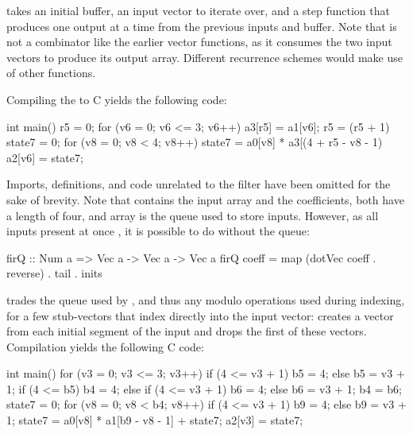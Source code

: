 \documentclass[../paper.tex]{subfiles}
\begin{document}
\noindent {} takes an initial buffer, an input vector to iterate over, and a step function that produces one output at a time from the previous inputs and buffer. Note that  is not a combinator like the earlier vector functions, as it consumes the two input vectors to produce its output array. Different recurrence schemes would make use of other functions. 


Compiling the  to C yields the following code:

\begin{code}
int main() {    
  r5 = 0;
  for (v6 = 0; v6 <= 3; v6++) {
    a3[r5] = a1[v6];
    r5 = (r5 + 1) %
    state7 = 0;
    for (v8 = 0; v8 < 4; v8++)
      state7 = a0[v8] * a3[(4 + r5 - v8 - 1) %
    a2[v6] = state7;
  }
}
\end{code}

\noindent Imports, definitions, and code unrelated to the filter have been omitted for the sake of brevity. Note that  contains the input array and  the coefficients, both have a length of four, and array  is the queue used to store inputs. However, as all inputs present at once , it is possible to do without the queue:


\begin{code}
firQ :: Num a => Vec a -> Vec a -> Vec a
firQ coeff = map (dotVec coeff . reverse) . tail . inits
\end{code}

 trades the queue used by , and thus any modulo operations used during indexing, for a few stub-vectors that index directly into the input vector:  creates a vector from each initial segment of the input and  drops the first of these vectors. Compilation yields the following C code:

\begin{code}
int main() {
  for (v3 = 0; v3 <= 3; v3++) {
    if (4 <= v3 + 1) { b5 = 4; } else { b5 = v3 + 1; }
    if (4 <= b5) { b4 = 4; }
    else {
      if (4 <= v3 + 1) { b6 = 4; } else { b6 = v3 + 1; }
      b4 = b6;
    }
    state7 = 0;
    for (v8 = 0; v8 < b4; v8++) {
      if (4 <= v3 + 1) { b9 = 4; } else { b9 = v3 + 1; }
      state7 = a0[v8] * a1[b9 - v8 - 1] + state7;
    }
    a2[v3] = state7;
  }
}
\end{code}
\end{document}
